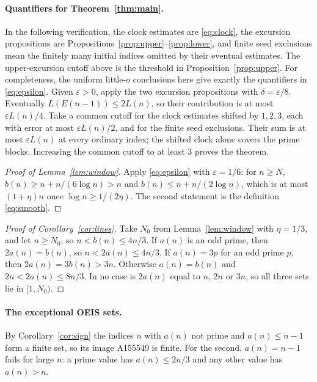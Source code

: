 \documentclass[11pt]{article}
\theoremstyle{remark}
\newcommand{\eps}{\varepsilon}
\begin{document}
\begin{appendices}
\paragraph{Quantifiers for Theorem~\ref{thm:main}.}\label{detail-quantifiers}
In the following verification, the clock estimates are \eqref{eq:clock},
the excursion propositions are Propositions~\ref{prop:upper}--\ref{prop:lower},
and finite seed exclusions mean the finitely many initial indices omitted
by their eventual estimates. The upper-excursion cutoff above is the
threshold in Proposition~\ref{prop:upper}.
For completeness, the uniform little-$o$ conclusions here give exactly
the quantifiers in \eqref{eq:epsilon}. Given $\eps>0$, apply the two
excursion propositions with $\delta=\eps/8$. Eventually
$L(E(n-1))\leq2L(n)$, so their contribution is at most
$\eps L(n)/4$. Take a common cutoff for the clock estimates shifted
by $1,2,3$, each with error at most $\eps L(n)/2$, and for the
finite seed exclusions. Their sum is at most $\eps L(n)$ at every
ordinary index; the shifted clock alone covers the prime blocks.
Increasing the common cutoff to at least $3$ proves the theorem.%

\label{detail-lemma-window}
\begin{proof}[Proof of Lemma~\ref{lem:window}]
Apply \eqref{eq:epsilon} with $\eps=1/6$: for $n\geq N$,
$b(n)\geq n+n/(6\log n)>n$ and $b(n)\leq n+n/(2\log n)$, which is at
most $(1+\eta)n$ once $\log n\geq1/(2\eta)$. The second statement is
the definition \eqref{eq:smooth}.
\end{proof}

\label{detail-corollary-lines}
\begin{proof}[Proof of Corollary~\ref{cor:lines}]
Take $N_0$ from Lemma~\ref{lem:window} with $\eta=1/3$, and let
$n\geq N_0$, so $n<b(n)\leq4n/3$. If $a(n)$ is an odd prime, then
$2a(n)=b(n)$, so $n<2a(n)\leq4n/3$. If $a(n)=3p$ for an odd prime $p$,
then $2a(n)=3b(n)>3n$. Otherwise $a(n)=b(n)$ and $2n<2a(n)\leq8n/3$.
In no case is $2a(n)$ equal to $n$, $2n$ or $3n$, so all three sets
lie in $[1,N_0)$.
\end{proof}

\paragraph{The exceptional OEIS sets.}
By Corollary~\ref{cor:sign} the indices
$n$ with $a(n)$ not prime and $a(n)\leq n-1$ form a finite set, so its
image A155549 is finite. For the
second, $a(n)=n-1$ fails for large $n$: a prime value has
$a(n)\leq2n/3$ and any other value has $a(n)>n$.


\end{appendices}
\end{document}
